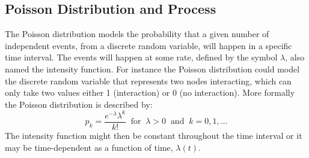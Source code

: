 \subsection{Poisson Distribution and Process}
\label{sec:Method:Possion}
The Poisson distribution models the probability that a given number of independent events, from a discrete random variable, will happen in a specific time interval.\cite{PoissonScience} The events will happen at some rate, defined by the symbol $\lambda$, also named the intensity function. For instance the Poisson distribution could model the discrete random variable that represents two nodes interacting, which can only take two values either 1 (interaction) or 0 (no interaction).
More formally the Poisson distribution is described by:
$$
p_k = \frac{e^{-\lambda}\lambda^k}{k!} \;\; \text{for} \;\; \lambda > 0 \;\; \text{and} \;\; k = 0,1,\dots
$$
The intensity function might then be constant throughout the time interval or it may be time-dependent as a function of time, $\lambda(t)$.

